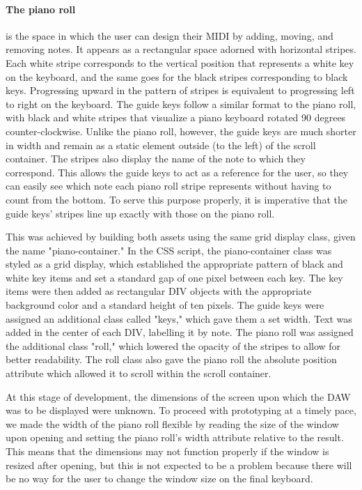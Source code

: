 \paragraph{The piano roll} is the space in which the user can design their MIDI by adding,
moving, and removing notes. It appears as a rectangular space adorned with horizontal stripes. Each
white stripe corresponds to the vertical position that represents a white key on the keyboard, and
the same goes for the black stripes corresponding to black keys. Progressing upward in the pattern
of stripes is equivalent to progressing left to right on the keyboard. The guide keys follow a
similar format to the piano roll, with black and white stripes that visualize a piano keyboard
rotated 90 degrees counter-clockwise. Unlike the piano roll, however, the guide keys are much
shorter in width and remain as a static element outside (to the left) of the scroll container.
The stripes also display the name of the note to which they correspond. This allows the guide keys
to act as a reference for the user, so they can easily see which note each piano roll stripe
represents without having to count from the bottom. To serve this purpose properly, it is
imperative that the guide keys' stripes line up exactly with those on the piano roll.

This was achieved by building both assets using the same grid display class, given the name
"piano-container." In the CSS script, the piano-container class was styled as a grid display,
which established the appropriate pattern of black and white key items and set a standard gap of
one pixel between each key. The key items were then added as rectangular DIV objects with the
appropriate background color and a standard height of ten pixels. The guide keys were assigned an
additional class called "keys," which gave them a set width. Text was added in the center of each
DIV, labelling it by note. The piano roll was assigned the additional class "roll," which lowered
the opacity of the stripes to allow for better readability. The roll class also gave the piano roll
the absolute position attribute which allowed it to scroll within the scroll container.

At this stage of development, the dimensions of the screen upon which the DAW was to be displayed
were unknown. To proceed with prototyping at a timely pace, we made the width of the piano roll
flexible by reading the size of the window upon opening and setting the piano roll's width
attribute relative to the result. This means that the dimensions may not function properly if the
window is resized after opening, but this is not expected to be a problem because there will be
no way for the user to change the window size on the final keyboard.

